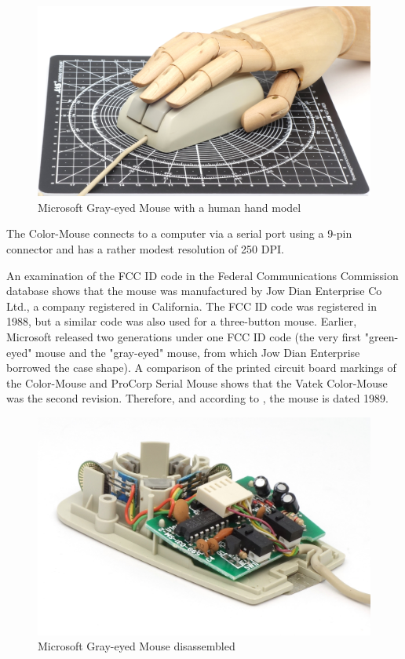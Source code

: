 \documentclass[11pt, a4paper]{article}
\begin{document}
\begin{figure}[h]
    \centering
    \includegraphics[scale=0.4]{1989_vatek_color_mouse/hand_30.jpg}
    \caption{Microsoft Gray-eyed Mouse with a human hand model}
    \label{fig:VatekColorHand}
\end{figure}

The Color-Mouse connects to a computer via a serial port using a 9-pin connector and has a rather modest resolution of 250 DPI\cite{dpi}.

An examination of the FCC ID code in the Federal Communications Commission database shows that the mouse was manufactured by Jow Dian Enterprise Co Ltd., a company registered in California. The FCC ID code was registered in 1988, but a similar code was also used for a three-button mouse. Earlier, Microsoft released two generations under one FCC ID code (the very first "green-eyed" mouse and the "gray-eyed" mouse, from which Jow Dian Enterprise borrowed the case shape). A comparison of the printed circuit board markings of the Color-Mouse and ProCorp Serial Mouse shows that the Vatek Color-Mouse was the second revision. Therefore, and according to \cite{mouses}, the mouse is dated 1989.

\begin{figure}[h]
    \centering
    \includegraphics[scale=0.8]{1989_vatek_color_mouse/inside_60.jpg}
    \caption{Microsoft Gray-eyed Mouse disassembled}
    \label{fig:VatekColorInside}
\end{figure}
\end{document}
